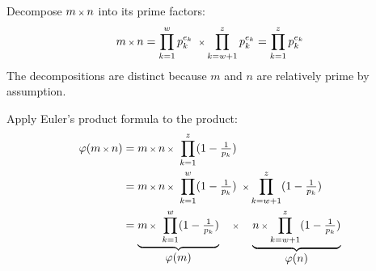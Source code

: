 Decompose $m \operatorname{\mbox{\scriptsize$\times$}} n$ into its prime factors:
\begin{align*}
m \operatorname{\mbox{\scriptsize$\times$}} n 
= \prod_{k=1}^{w}p_{k}^{e_{k}} \  \operatorname{\mbox{\scriptsize$\times$}} \prod_{k=w+1}^{z}p_{k}^{e_{k}}
= \prod_{k=1}^{z}p_{k}^{e_{k}}
\end{align*}
The decompositions are distinct because $m$ and $n$ are relatively prime by assumption.

Apply Euler's product formula to the product:
\begin{align*}
\varphi(m \mult n)
& = m \mult n \mult \ \prod_{k=1}^{z}(1-\tfrac{1}{p_{k}})
\\
& = m \mult n \mult \ \prod_{k=1}^{w}(1-\tfrac{1}{p_{k}}) \ \mult \prod_{k=w+1}^{z}(1-\tfrac{1}{p_{k}})
\\
& = \underbrace{m \mult\ \prod_{k=1}^{w}(1-\tfrac{1}{p_{k}})}_{\displaystyle\varphi(m)}
    \quad\mult\quad
    \underbrace{n \mult \prod_{k=w+1}^{z}(1-\tfrac{1}{p_{k}})}_{\displaystyle\varphi(n)}
\end{align*}

